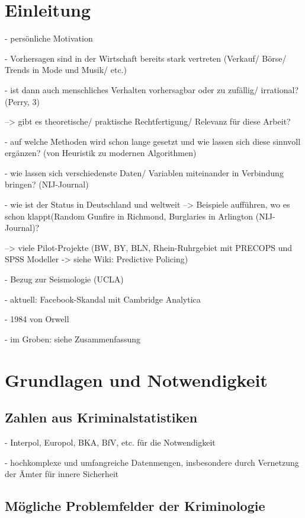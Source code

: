 \documentclass[a4paper,12pt,parskip,bibtotoc,liststotoc]{article}
\begin{document}
\newpage
\section{Einleitung}

- persönliche Motivation

- Vorhersagen sind in der Wirtschaft bereits stark vertreten (Verkauf/ Börse/ Trends in Mode und Musik/ etc.)

- ist dann auch menschliches Verhalten vorhersagbar oder zu zufällig/ irrational? (Perry, 3)

--> gibt es theoretische/ praktische Rechtfertigung/ Relevanz für diese Arbeit?

- auf welche Methoden wird schon lange gesetzt und wie lassen sich diese sinnvoll ergänzen? (von Heuristik zu modernen Algorithmen)

- wie lassen sich verschiedenste Daten/ Variablen miteinander in Verbindung bringen? (NIJ-Journal)

- wie ist der Status in Deutschland und weltweit 
--> Beispiele aufführen, wo es schon klappt(Random Gunfire in Richmond, Burglaries in Arlington (NIJ-Journal)?

--> viele Pilot-Projekte (BW, BY, BLN, Rhein-Ruhrgebiet mit PRECOPS und SPSS Modeller -> siehe Wiki: Predictive Policing)

- Bezug zur Seismologie (UCLA)

- aktuell: Facebook-Skandal mit Cambridge Analytica 

- 1984 von Orwell


- im Groben: siehe Zusammenfassung 


\newpage
\section{Grundlagen und Notwendigkeit}

\subsection{Zahlen aus Kriminalstatistiken}
 
- Interpol, Europol, BKA, BfV, etc. für die Notwendigkeit

- hochkomplexe und umfangreiche Datenmengen, insbesondere durch Vernetzung der Ämter für innere Sicherheit

\subsection{Mögliche Problemfelder der Kriminologie}  
\end{document}
